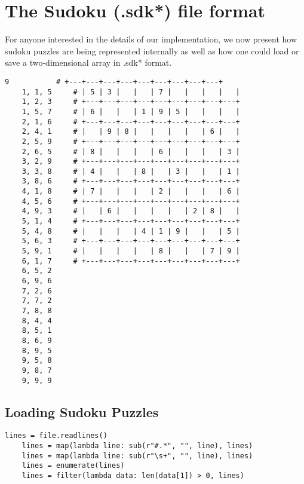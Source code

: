 \documentclass[12pt]{article}
\begin{document}
\pagebreak

\section{The Sudoku (.sdk*) file format}

For anyone interested in the details of our implementation,
we now present how sudoku puzzles are being represented internally
as well as how one could load or save a two-dimensional array in .sdk* format. \\

\begin{lstlisting}[caption={A .sdk* file example}]
    9           # +---+---+---+---+---+---+---+---+---+
    1, 1, 5     # | 5 | 3 |   |   | 7 |   |   |   |   |
    1, 2, 3     # +---+---+---+---+---+---+---+---+---+
    1, 5, 7     # | 6 |   |   | 1 | 9 | 5 |   |   |   |
    2, 1, 6     # +---+---+---+---+---+---+---+---+---+
    2, 4, 1     # |   | 9 | 8 |   |   |   |   | 6 |   |
    2, 5, 9     # +---+---+---+---+---+---+---+---+---+
    2, 6, 5     # | 8 |   |   |   | 6 |   |   |   | 3 |
    3, 2, 9     # +---+---+---+---+---+---+---+---+---+
    3, 3, 8     # | 4 |   |   | 8 |   | 3 |   |   | 1 |
    3, 8, 6     # +---+---+---+---+---+---+---+---+---+
    4, 1, 8     # | 7 |   |   |   | 2 |   |   |   | 6 |
    4, 5, 6     # +---+---+---+---+---+---+---+---+---+
    4, 9, 3     # |   | 6 |   |   |   |   | 2 | 8 |   |
    5, 1, 4     # +---+---+---+---+---+---+---+---+---+
    5, 4, 8     # |   |   |   | 4 | 1 | 9 |   |   | 5 |
    5, 6, 3     # +---+---+---+---+---+---+---+---+---+
    5, 9, 1     # |   |   |   |   | 8 |   |   | 7 | 9 |
    6, 1, 7     # +---+---+---+---+---+---+---+---+---+
    6, 5, 2
    6, 9, 6
    7, 2, 6
    7, 7, 2
    7, 8, 8
    8, 4, 4
    8, 5, 1
    8, 6, 9
    8, 9, 5
    9, 5, 8
    9, 8, 7
    9, 9, 9
\end{lstlisting}

\pagebreak

\subsection{Loading Sudoku Puzzles}

\begin{lstlisting}[caption={Removing any useless characters}]
    lines = file.readlines()
    lines = map(lambda line: sub(r"#.*", "", line), lines)
    lines = map(lambda line: sub(r"\s+", "", line), lines)
    lines = enumerate(lines)
    lines = filter(lambda data: len(data[1]) > 0, lines)
\end{lstlisting}
\end{document}
